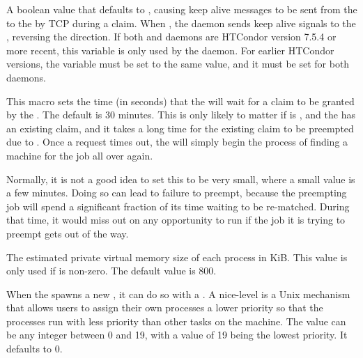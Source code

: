 \begin{description}
\label{param:StartdSendsAlives}
\item[\Macro{STARTD\_SENDS\_ALIVES}]
  A boolean value that defaults to ,
  causing keep alive messages to be sent from the  to the
   by TCP during a claim.
  When , the  daemon sends keep alive signals
  to the , reversing the direction.
  If both  and  daemons are HTCondor version 7.5.4
  or more recent, this variable is only used by the  daemon.
  For earlier HTCondor versions, the variable must be set to the same value,
  and it must be set for both daemons.

\label{param:RequestClaimTimeout}
\item[\Macro{REQUEST\_CLAIM\_TIMEOUT}]
  This macro sets the time (in
  seconds) that the  will wait for a claim to be granted by the
  .  The default is 30 minutes.  This is only likely to matter
  if  is , and the
   has an existing claim, and it takes a long time for the
  existing claim to be preempted due to .
  Once a request times out, the  will simply begin the process
  of finding a machine for the job all over again.

  Normally, it is not a good idea to set this to be very small, 
  where a small value is a few minutes.  
  Doing so can lead to failure to preempt, because the
  preempting job will spend a significant fraction of its time waiting
  to be re-matched.  During that time, it would miss out on any
  opportunity to run if the job it is trying to preempt gets out of
  the way.

\label{param:ShadowSizeEstimate}
\item[\Macro{SHADOW\_SIZE\_ESTIMATE}]
  The estimated private virtual memory size of each
   process in  KiB.
  This value is only used if  is non-zero.
  The default value is 800.

\label{param:ShadowReniceIncrement}
\item[\Macro{SHADOW\_RENICE\_INCREMENT}]
  When the  spawns a new
  , it can do so with a .  A
  nice-level is a Unix mechanism that allows users to assign their own
  processes a lower priority so that the processes run with less
  priority than other tasks on the machine.  The value can be any
  integer between 0 and 19, with a value of 19 being the lowest
  priority.  It defaults to 0.


\end{description}

